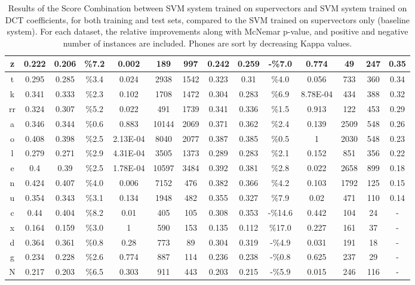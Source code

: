 \begin{table}[H]
{\begin{tabular}{|c| |c|c|c|c|c|c| |c|c|c|c|c|c| |c|}
\rowcolor{lightgray} z & 0.222 & 0.206 & \%7.2 & 0.002 & 189 & 997 & 0.242 & 0.259 & -\%7.0 & 0.774 & 49 & 247 & 0.35 \\ \hline
\rowcolor{lightgray} t & 0.295 & 0.285 & \%3.4 & 0.024 & 2938 & 1542 & 0.323 & 0.31 & \%4.0 & 0.056 & 733 & 360 & 0.34 \\ \hline
k & 0.341 & 0.333 & \%2.3 & 0.102 & 1708 & 1472 & 0.304 & 0.283 & \%6.9 & 8.78E-04 & 434 & 388 & 0.32 \\ \hline
\rowcolor{lightgray} rr & 0.324 & 0.307 & \%5.2 & 0.022 & 491 & 1739 & 0.341 & 0.336 & \%1.5 & 0.913 & 122 & 453 & 0.29 \\ \hline
a & 0.346 & 0.344 & \%0.6 & 0.883 & 10144 & 2069 & 0.371 & 0.362 & \%2.4 & 0.139 & 2509 & 548 & 0.26 \\ \hline
\rowcolor{lightgray} o & 0.408 & 0.398 & \%2.5 & 2.13E-04 & 8040 & 2077 & 0.387 & 0.385 & \%0.5 & 1 & 2030 & 548 & 0.23 \\ \hline
\rowcolor{lightgray} l & 0.279 & 0.271 & \%2.9 & 4.31E-04 & 3505 & 1373 & 0.289 & 0.283 & \%2.1 & 0.152 & 851 & 356 & 0.22 \\ \hline
\rowcolor{lightgray} e & 0.4 & 0.39 & \%2.5 & 1.78E-04 & 10597 & 3484 & 0.392 & 0.381 & \%2.8 & 0.022 & 2658 & 899 & 0.18 \\ \hline
\rowcolor{lightgray} n & 0.424 & 0.407 & \%4.0 & 0.006 & 7152 & 476 & 0.382 & 0.366 & \%4.2 & 0.103 & 1792 & 125 & 0.15 \\ \hline
u & 0.354 & 0.343 & \%3.1 & 0.134 & 1948 & 482 & 0.355 & 0.327 & \%7.9 & 0.02 & 471 & 110 & 0.14 \\ \hline
c & 0.44 & 0.404 & \%8.2 & 0.01 & 405 & 105 & 0.308 & 0.353 & -\%14.6 & 0.442 & 104 & 24 & - \\ \hline
x & 0.164 & 0.159 & \%3.0 & 1 & 590 & 153 & 0.135 & 0.112 & \%17.0 & 0.227 & 161 & 37 & - \\ \hline
d & 0.364 & 0.361 & \%0.8 & 0.28 & 773 & 89 & 0.304 & 0.319 & -\%4.9 & 0.031 & 191 & 18 & - \\ \hline
g & 0.234 & 0.228 & \%2.6 & 0.774 & 887 & 114 & 0.236 & 0.238 & -\%0.8 & 0.625 & 237 & 29 & - \\ \hline
N & 0.217 & 0.203 & \%6.5 & 0.303 & 911 & 443 & 0.203 & 0.215 & -\%5.9 & 0.015 & 246 & 116 & - \\ \hline
\end{tabular}

}
\caption{Results of the Score Combination between SVM system trained on supervectors 
and SVM system trained on DCT coefficients, for both training and test sets, 
compared to the SVM trained on supervectors only (baseline system).
For each dataset, the relative improvements along with McNemar p-value, and
positive and negative number of instances are included. Phones are sort by decreasing Kappa values.}
\label{tab:scoreCombinationAppendixTable}
\end{table}

